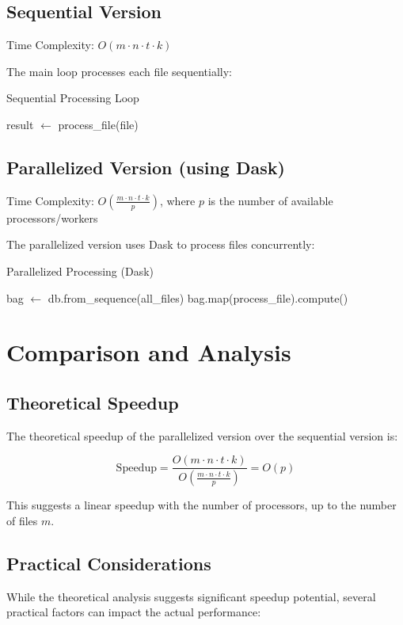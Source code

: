 \documentclass[11pt,a4paper]{article}
\begin{document}
\subsection{Sequential Version}
Time Complexity: $O(m \cdot n \cdot t \cdot k)$

The main loop processes each file sequentially:

\begin{algorithm}
\caption{Sequential Processing Loop}
\begin{algorithmic}
    \State result $\gets$ process\_file(file)
\EndFor
\end{algorithmic}
\end{algorithm}

\subsection{Parallelized Version (using Dask)}
Time Complexity: $O(\frac{m \cdot n \cdot t \cdot k}{p})$, where $p$ is the number of available processors/workers

The parallelized version uses Dask to process files concurrently:

\begin{algorithm}
\caption{Parallelized Processing (Dask)}
\begin{algorithmic}
\State bag $\gets$ db.from\_sequence(all\_files)
\State bag.map(process\_file).compute()
\end{algorithmic}
\end{algorithm}

\section{Comparison and Analysis}

\subsection{Theoretical Speedup}
The theoretical speedup of the parallelized version over the sequential version is:

\[ \text{Speedup} = \frac{O(m \cdot n \cdot t \cdot k)}{O(\frac{m \cdot n \cdot t \cdot k}{p})} = O(p) \]

This suggests a linear speedup with the number of processors, up to the number of files $m$.

\subsection{Practical Considerations}
While the theoretical analysis suggests significant speedup potential, several practical factors can impact the actual performance:
\end{document}
